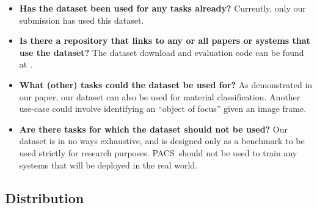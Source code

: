 \documentclass[runningheads]{llncs}
\newcommand{\names}{\textsc{PACS}}
\begin{document}
\begin{itemize}
    \item \textbf{Has the dataset been used for any tasks already?} Currently, only our submission has used this dataset. 
    
    \item \textbf{Is there a repository that links to any or all papers or systems that
use the dataset?} The dataset download and evaluation code can be found at \href{https://github.com/samuelyu2002/PACS}{}.

\item \textbf{What (other) tasks could the dataset be used for?} As demonstrated in our paper, our dataset can also be used for material classification. Another use-case could involve identifying an ``object of focus'' given an image frame. 

\item \textbf{Are there tasks for which the dataset should not be used?} Our dataset is in no ways exhaustive, and is designed only as a benchmark to be used strictly for research purposes. \names\ should not be used to train any systems that will be deployed in the real world.
\end{itemize}


\subsection{Distribution}
\end{document}
